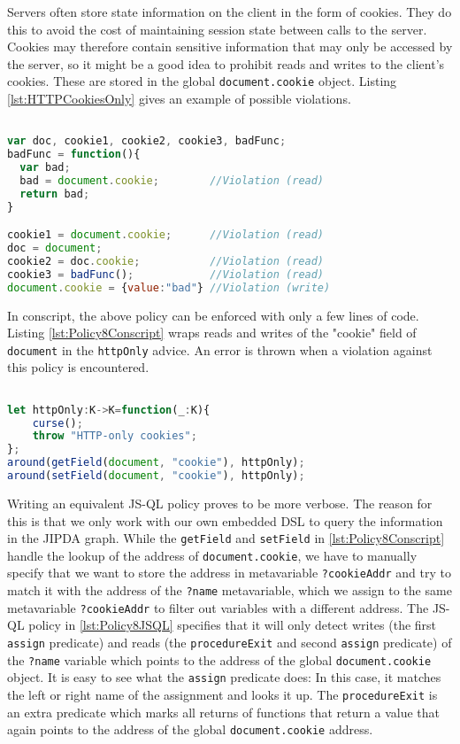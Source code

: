 Servers often store state information on the client in the form of cookies. They do this to avoid the cost of maintaining session state between calls to the server. Cookies may therefore contain sensitive information that may only be accessed by the server, so it might be a good idea to prohibit reads and writes to the client's cookies. These are stored in the global \texttt{document.cookie} object. Listing \ref{lst:HTTPCookiesOnly} gives an example of possible violations.

\begin{lstlisting}[label={lst:HTTPCookiesOnly},language=JavaScript,caption=HTTP-cookies only example,mathescape=true]  % float=t?

var doc, cookie1, cookie2, cookie3, badFunc;
badFunc = function(){
  var bad;
  bad = document.cookie;        //Violation (read)
  return bad;
}

cookie1 = document.cookie;      //Violation (read)
doc = document;
cookie2 = doc.cookie;           //Violation (read)
cookie3 = badFunc();            //Violation (read)
document.cookie = {value:"bad"} //Violation (write)
\end{lstlisting}

In conscript, the above policy can be enforced with only a few lines of code. Listing \ref{lst:Policy8Conscript} wraps reads and writes of the "cookie" field of \texttt{document} in the \texttt{httpOnly} advice. An error is thrown when a violation against this policy is encountered.

\begin{lstlisting}[label={lst:Policy8Conscript},language=JavaScript,caption=Policy 8 in ConScript,mathescape=true]  % float=t?

let httpOnly:K->K=function(_:K){ 
    curse(); 
    throw "HTTP-only cookies"; 
};
around(getField(document, "cookie"), httpOnly); 
around(setField(document, "cookie"), httpOnly);
\end{lstlisting}

Writing an equivalent JS-QL policy proves to be more verbose. The reason for this is that we only work with our own embedded DSL to query the information in the JIPDA graph. While the \texttt{getField} and \texttt{setField} in \ref{lst:Policy8Conscript} handle the lookup of the address of \texttt{document.cookie}, we have to manually specify that we want to store the address in metavariable \texttt{?cookieAddr} and try to match it with the address of the \texttt{?name} metavariable, which we assign to the same metavariable \texttt{?cookieAddr} to filter out variables with a different address. The JS-QL policy in \ref{lst:Policy8JSQL} specifies that it will only detect writes (the first \texttt{assign} predicate) and reads (the \texttt{procedureExit} and second \texttt{assign} predicate) of the \texttt{?name} variable which points to the address of the global \texttt{document.cookie} object. It is easy to see what the \texttt{assign} predicate does: In this case, it matches the left or right name of the assignment and looks it up. The \texttt{procedureExit} is an extra predicate which marks all returns of functions that return a value that again points to the address of the global \texttt{document.cookie} address.


